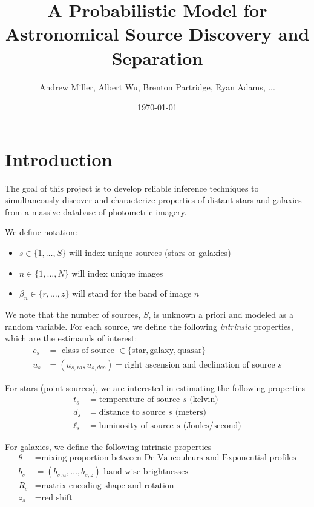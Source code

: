 \documentclass[11pt]{article}
\title{A Probabilistic Model for Astronomical Source Discovery and Separation}
\author{Andrew Miller, Albert Wu, Brenton Partridge, Ryan Adams, ...}
\date{\today}
\begin{document}
\maketitle
\tableofcontents
\newpage

\section{Introduction}

The goal of this project is to develop reliable inference techniques to simultaneously discover and characterize properties of distant stars and galaxies from a massive database of photometric imagery.  

We define notation: 
\begin{itemize} \itemsep 0pt
\item $s \in \{1, \dots, S\}$ will index unique sources (stars or galaxies)
\item $n \in \{1, \dots, N\}$ will index unique images
\item $\beta_n \in \{r, \dots, z\}$ will stand for the band of image $n$
\end{itemize}

We note that the number of sources, $S$, is unknown a priori and modeled as a random variable.  For each source, we define the following \emph{intrinsic} properties, which are the estimands of interest: 
\begin{align*}
  c_s &= \text{ class of source } \in \{ \text{star}, \text{galaxy}, \text{quasar} \} \\
  u_s &= (u_{s,ra}, u_{s,dec}) = \text{right ascension and declination of source $s$} 
\end{align*}

For stars (point sources), we are interested in estimating the following properties 
\begin{align*}
  t_s &= \text{temperature of source $s$ (kelvin)} \\
  d_s &= \text{distance to source $s$ (meters)} \\
  \ell_s &= \text{luminosity of source $s$ (Joules/second)} 
\end{align*}

For galaxies, we define the following intrinsic properties 
\begin{align*}
  \theta &= \text{mixing proportion between De Vaucouleurs and Exponential profiles} \\
  b_s    &= (b_{s,u}, \dots, b_{s,z}) \text{ band-wise brightnesses } \\
  R_s    &= \text{matrix encoding shape and rotation} \\
  z_s    &= \text{red shift}
\end{align*}
\end{document}

